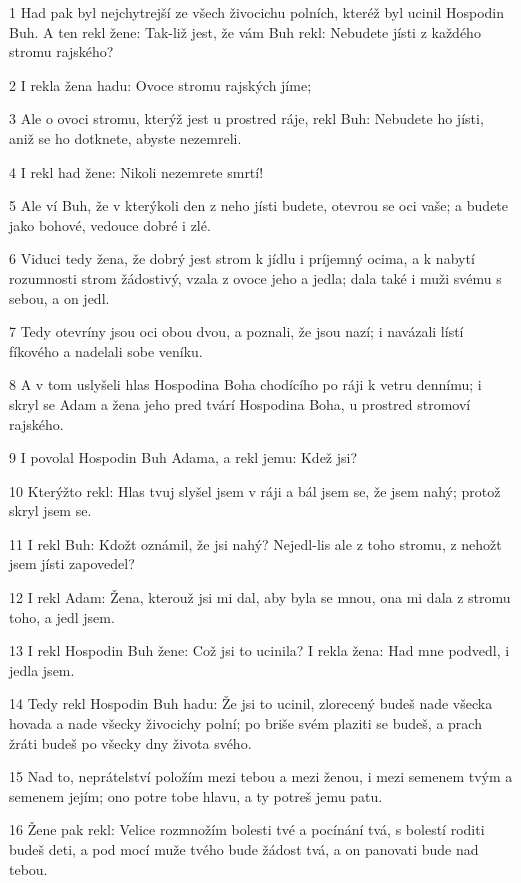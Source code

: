 \par 1 Had pak byl nejchytrejší ze všech živocichu polních, kteréž byl ucinil Hospodin Buh. A ten rekl žene: Tak-liž jest, že vám Buh rekl: Nebudete jísti z každého stromu rajského?
\par 2 I rekla žena hadu: Ovoce stromu rajských jíme;
\par 3 Ale o ovoci stromu, kterýž jest u prostred ráje, rekl Buh: Nebudete ho jísti, aniž se ho dotknete, abyste nezemreli.
\par 4 I rekl had žene: Nikoli nezemrete smrtí!
\par 5 Ale ví Buh, že v kterýkoli den z neho jísti budete, otevrou se oci vaše; a budete jako bohové, vedouce dobré i zlé.
\par 6 Viduci tedy žena, že dobrý jest strom k jídlu i príjemný ocima, a k nabytí rozumnosti strom žádostivý, vzala z ovoce jeho a jedla; dala také i muži svému s sebou, a on jedl.
\par 7 Tedy otevríny jsou oci obou dvou, a poznali, že jsou nazí; i navázali lístí fíkového a nadelali sobe veníku.
\par 8 A v tom uslyšeli hlas Hospodina Boha chodícího po ráji k vetru dennímu; i skryl se Adam a žena jeho pred tvárí Hospodina Boha, u prostred stromoví rajského.
\par 9 I povolal Hospodin Buh Adama, a rekl jemu: Kdež jsi?
\par 10 Kterýžto rekl: Hlas tvuj slyšel jsem v ráji a bál jsem se, že jsem nahý; protož skryl jsem se.
\par 11 I rekl Buh: Kdožt oznámil, že jsi nahý? Nejedl-lis ale z toho stromu, z nehožt jsem jísti zapovedel?
\par 12 I rekl Adam: Žena, kterouž jsi mi dal, aby byla se mnou, ona mi dala z stromu toho, a jedl jsem.
\par 13 I rekl Hospodin Buh žene: Což jsi to ucinila? I rekla žena: Had mne podvedl, i jedla jsem.
\par 14 Tedy rekl Hospodin Buh hadu: Že jsi to ucinil, zlorecený budeš nade všecka hovada a nade všecky živocichy polní; po briše svém plaziti se budeš, a prach žráti budeš po všecky dny života svého.
\par 15 Nad to, neprátelství položím mezi tebou a mezi ženou, i mezi semenem tvým a semenem jejím; ono potre tobe hlavu, a ty potreš jemu patu.
\par 16 Žene pak rekl: Velice rozmnožím bolesti tvé a pocínání tvá, s bolestí roditi budeš deti, a pod mocí muže tvého bude žádost tvá, a on panovati bude nad tebou.
